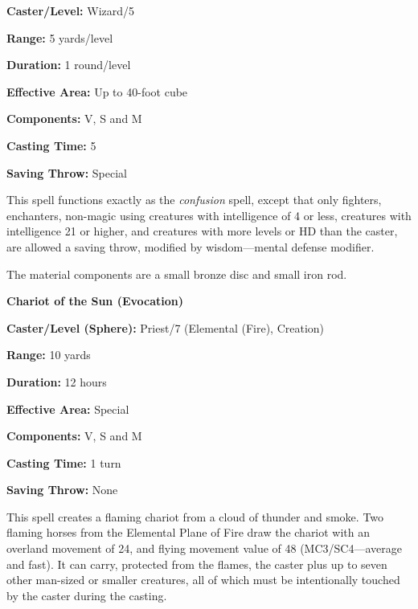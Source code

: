 \begin{multicols}{2}
\begin{minipage}{\columnwidth}
\noindent \textbf{Caster/Level:} Wizard/5

\noindent \textbf{Range:} 5 yards/level

\noindent \textbf{Duration:} 1 round/level

\noindent \textbf{Effective Area:} Up to 40-foot cube

\noindent \textbf{Components:} V, S and M

\noindent \textbf{Casting Time:} 5

\noindent \textbf{Saving Throw:} Special

\end{minipage}

This spell functions exactly as the \textit{confusion} spell, except that only fighters, enchanters, non-magic using creatures with intelligence of 4 or less, creatures with intelligence 21 or higher, and creatures with more levels or HD than the caster, are allowed a saving throw, modified by wisdom---mental defense modifier. 

The material components are a small bronze disc and small iron rod.

\vspace{1em}

\noindent
\begin{minipage}{\columnwidth}

\noindent \textbf{Chariot of the Sun (Evocation)}

\noindent \textbf{Caster/Level (Sphere):} Priest/7 (Elemental (Fire), Creation)

\noindent \textbf{Range:} 10 yards

\noindent \textbf{Duration:} 12 hours

\noindent \textbf{Effective Area:} Special

\noindent \textbf{Components:} V, S and M

\noindent \textbf{Casting Time:} 1 turn

\noindent \textbf{Saving Throw:} None

\end{minipage}

This spell creates a flaming chariot from a cloud of thunder and smoke.  Two flaming horses from the Elemental Plane of Fire draw the chariot with an overland movement of 24, and flying movement value of 48 (MC3/SC4---average and fast).  It can carry, protected from the flames, the caster plus up to seven other man-sized or smaller creatures, all of which must be intentionally touched by the caster during the casting.  


\end{multicols}
